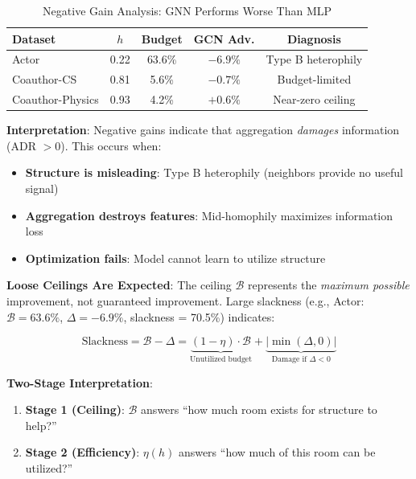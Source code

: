 \begin{table}[t]
\centering
\caption{Negative Gain Analysis: GNN Performs Worse Than MLP}
\label{tab:negative_gains}
\small
\begin{tabular}{@{}lcccc@{}}
\toprule
\textbf{Dataset} & \textbf{$h$} & \textbf{Budget} & \textbf{GCN Adv.} & \textbf{Diagnosis} \\
\midrule
Actor & 0.22 & 63.6\% & $-6.9\%$ & Type B heterophily \\
Coauthor-CS & 0.81 & 5.6\% & $-0.7\%$ & Budget-limited \\
Coauthor-Physics & 0.93 & 4.2\% & $+0.6\%$ & Near-zero ceiling \\
\bottomrule
\end{tabular}
\end{table}

\textbf{Interpretation}: Negative gains indicate that aggregation \textit{damages} information (ADR $> 0$). This occurs when:
\begin{itemize}
    \item \textbf{Structure is misleading}: Type B heterophily (neighbors provide no useful signal)
    \item \textbf{Aggregation destroys features}: Mid-homophily maximizes information loss
    \item \textbf{Optimization fails}: Model cannot learn to utilize structure
\end{itemize}

\textbf{Loose Ceilings Are Expected}: The ceiling $\mathcal{B}$ represents the \textit{maximum possible} improvement, not guaranteed improvement. Large slackness (e.g., Actor: $\mathcal{B} = 63.6\%$, $\Delta = -6.9\%$, slackness = 70.5\%) indicates:

\begin{equation}
    \text{Slackness} = \mathcal{B} - \Delta = \underbrace{(1 - \eta) \cdot \mathcal{B}}_{\text{Unutilized budget}} + \underbrace{|\min(\Delta, 0)|}_{\text{Damage if } \Delta < 0}
\end{equation}

\textbf{Two-Stage Interpretation}:
\begin{enumerate}
    \item \textbf{Stage 1 (Ceiling)}: $\mathcal{B}$ answers ``how much room exists for structure to help?''
    \item \textbf{Stage 2 (Efficiency)}: $\eta(h)$ answers ``how much of this room can be utilized?''
\end{enumerate}

